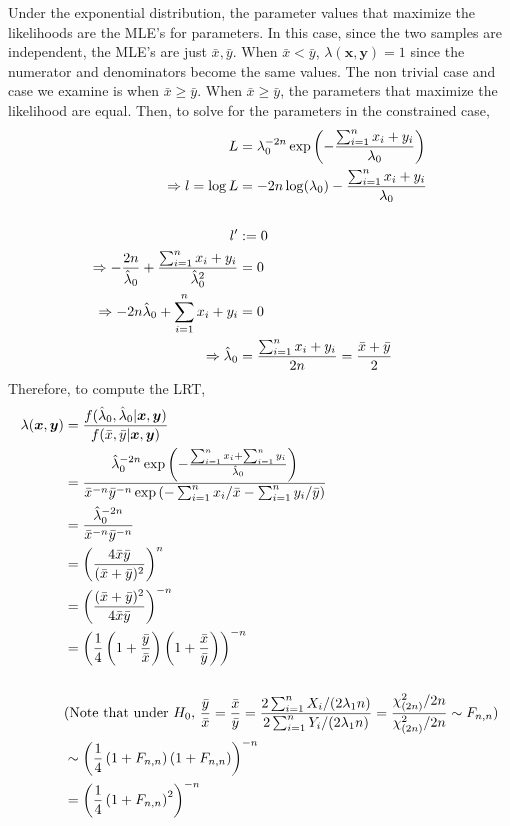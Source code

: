\documentclass[11pt]{article}
\newcommand{\p}[1]{\left(#1\right)}
\begin{document}
\noindent
Under the exponential distribution, the parameter values that maximize the likelihoods are the MLE's for 
parameters. In this case, since the two samples are independent, the MLE's are just $\bar x, \bar y$. When
$\bar x < \bar y$, $\lambda(\bm x, \bm y) = 1$ since the numerator and denominators become the same values. 
The non trivial case and case we examine is when $\bar x \ge \bar y$. When $\bar x \ge \bar y$, the parameters
that maximize the likelihood are equal. Then, to solve for the parameters in the constrained case, 
\[
\begin{aligned}
  L&=\lambda_0^{-2n}\exp\p{-\frac{\suml x_i + y_i}{\lambda_0}}\\
  \Rightarrow l=\log L &= -2n\log(\lambda_0) - \frac{\suml x_i + y_i}{\lambda_0}\\
  \\
  l' &:=0 \\
  \Rightarrow -\frac{2n}{\hat\lambda_0} + \frac{\suml x_i + y_i}{\hat\lambda_0^2} &= 0 \\
  \Rightarrow -2n\hat\lambda_0 + \suml x_i + y_i &= 0 \\
  \Rightarrow \hat\lambda_0 &= \frac{\suml x_i + y_i}{2n} =  \frac{\bar x + \bar y}{2}
\end{aligned}
\]
Therefore, to compute the LRT, 
\def\xbar{\bar x}
\def\ybar{\bar y}
\[
\begin{aligned}
  \lambda(\bm x, \bm y) &= \frac{f(\hat\lambda_0, \hat\lambda_0 | \bm x, \bm y)}{f(\bar x, \bar y | \bm x, \bm y)}\\
                        &= \frac{\hat\lambda_0^{-2n}\exp\p{-\frac{\suml x_i + \suml y_i}{\hat\lambda_0}}}{\bar x^{-n} \bar y^{-n}\exp\p{-\suml x_i/\bar x - \suml y_i /\bar y}}\\
                        &= \frac{\hat\lambda_0^{-2n}}{\bar x^{-n} \bar y^{-n}}\\
                        &= \p{\frac{4\bar x \bar y}{(\bar x + \bar y)^2}}^n \\
                        &= \p{\frac{(\bar x + \bar y)^2}{4\bar x \bar y}}^{-n} \\
                        &= \p{\frac{1}{4}\p{1+\frac{\ybar}{\xbar}}\p{1+\frac{\xbar}{\ybar}}}^{-n}\\
  \\
  &(\text{Note that under $H_0$, $\frac{\ybar}{\xbar} = \frac{\xbar}{\ybar} = \frac{2\suml X_i/(2\lambda_1n)}{2\suml Y_i/(2\lambda_1n)} = \frac{\chi^2_{(2n)}/2n}{\chi^2_{(2n)}/2n} \sim F_{n,n}$})\\
  &\sim \p{\frac{1}{4}\p{1+F_{n,n}}\p{1+F_{n,n}}}^{-n}\\
  &= \p{\frac{1}{4}\p{1+F_{n,n}}^2}^{-n}\\
\end{aligned}
\]
\end{document}
